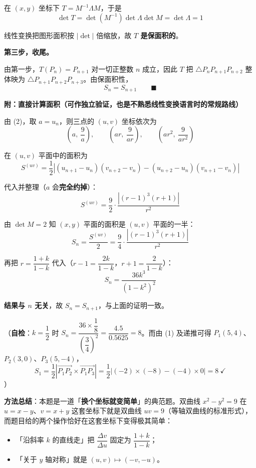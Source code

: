 \begin{answer}
在 $(x,y)$ 坐标下 $T=M^{-1}\Lambda M$，于是
\nopagebreak[4]
\[\det T=\det\left(M^{-1}\right)\det\Lambda\det M=\det\Lambda=1\]

线性变换把图形面积按 $\left|\det\right|$ 倍缩放，故 \textbf{$T$ 是保面积的}。

\textbf{第三步，收尾。}

由第一步，$T\left(P_n\right)=P_{n+1}$ 对一切正整数 $n$ 成立，因此 $T$ 把 $\triangle P_nP_{n+1}P_{n+2}$ 整体映为 $\triangle P_{n+1}P_{n+2}P_{n+3}$。由保面积性，
\nopagebreak[4]
\[S_n=S_{n+1}\qquad\blacksquare\]

\par\medskip

\textbf{附：直接计算面积（可作独立验证，也是不熟悉线性变换语言时的常规路线）}

由 (2)，取 $a=u_n$，则三点的 $(u,v)$ 坐标依次为
\nopagebreak[4]
\[\left(a,\ \frac9a\right),\qquad\left(ar,\ \frac9{ar}\right),\qquad\left(ar^{2},\ \frac9{ar^{2}}\right)\]

在 $(u,v)$ 平面中的面积为
\nopagebreak[4]
\[S^{(uv)}=\frac12\left|\left(u_{n+1}-u_n\right)\left(v_{n+2}-v_n\right)-\left(u_{n+2}-u_n\right)\left(v_{n+1}-v_n\right)\right|\]

代入并整理（$a$ 会\textbf{完全约掉}）：
\nopagebreak[4]
\[S^{(uv)}=\frac92\cdot\frac{\left|(r-1)^{3}(r+1)\right|}{r^{2}}\]

由 $\det M=2$ 知 $(x,y)$ 平面的面积是 $(u,v)$ 平面的一半：
\nopagebreak[4]
\[S_n=\frac{S^{(uv)}}2=\frac94\cdot\frac{\left|(r-1)^{3}(r+1)\right|}{r^{2}}\]

再把 $r=\dfrac{1+k}{1-k}$ 代入（$r-1=\dfrac{2k}{1-k}$，$r+1=\dfrac2{1-k}$）：
\nopagebreak[4]
\[S_n=\frac{36k^{3}}{\left(1-k^{2}\right)^{2}}\]

\textbf{结果与 $n$ 无关}，故 $S_n=S_{n+1}$，与上面的证明一致。

（\textbf{自检}：$k=\dfrac12$ 时 $S_n=\dfrac{36\times\dfrac18}{\left(\dfrac34\right)^{2}}=\dfrac{4.5}{0.5625}=8$。而由 (1) 及递推可得 $P_1(5,4)$、$P_2(3,0)$、$P_3(5,-4)$，
\nopagebreak[4]
\[S_1=\frac12\left|\overrightarrow{P_1P_2}\times\overrightarrow{P_1P_3}\right|=\frac12\left|(-2)\times(-8)-(-4)\times0\right|=8\ \checkmark\]
）

\begin{gktip}
\textbf{方法总结}：本题是一道「\textbf{换个坐标就变简单}」的典范题。双曲线 $x^{2}-y^{2}=9$ 在 $u=x-y$、$v=x+y$ 这套坐标下就是双曲线 $uv=9$（等轴双曲线的标准形式），而题目给的两个操作恰好在这套坐标下变得极其简单：
\begin{itemize}
\item 「沿斜率 $k$ 的直线走」把 $\dfrac{\Delta v}{\Delta u}$ 固定为 $\dfrac{1+k}{1-k}$；
\item 「关于 $y$ 轴对称」就是 $(u,v)\mapsto(-v,-u)$。
\end{itemize}


\end{gktip}
\end{answer}
